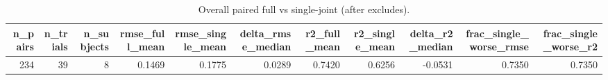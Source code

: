 \begin{table}
\caption{Overall paired full vs single-joint (after excludes).}
\label{tab:table0_overall}
\begin{tabular}{rrrrrrrrrrr}
\toprule
n_pairs & n_trials & n_subjects & rmse_full_mean & rmse_single_mean & delta_rmse_median & r2_full_mean & r2_single_mean & delta_r2_median & frac_single_worse_rmse & frac_single_worse_r2 \\
\midrule
234 & 39 & 8 & 0.1469 & 0.1775 & 0.0289 & 0.7420 & 0.6256 & -0.0531 & 0.7350 & 0.7350 \\
\bottomrule
\end{tabular}
\end{table}
